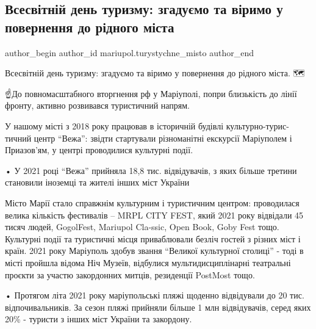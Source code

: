  
 
 
 
 

\subsection{Всесвітній день туризму: згадуємо та віримо у повернення до рідного міста}
\label{sec:27_09_2023.fb.mariupol.turystychne_misto.1.vsesvitnii_den_turyzmu_povernennja}

\ifcmt
 author_begin
   author_id mariupol.turystychne_misto
 author_end
\fi

Всесвітній день туризму: згадуємо та віримо у повернення до рідного міста. 🗺️

☝️До повномасштабного вторгнення рф у Маріуполі, попри близькість до лінії
фронту, активно розвивався туристичний напрям. 

У нашому місті з 2018 року працював в історичній будівлі культурно-турис\hyp{}тичний
центр \enquote{Вежа}: звідти стартували різноманітні екскурсії Маріуполем і Приазов'ям,
у центрі проводилися культурні події. 

• У 2021 році \enquote{Вежа} прийняла 18,8 тис. відвідувачів, з яких більше третини
становили іноземці та жителі інших міст України 

Місто Марії стало справжнім культурним і туристичним центром: проводилася
велика кількість фестивалів – MRPL CITY FEST, який 2021 року відвідали 45 тисяч
людей, GogolFest, Mariupol Cla\hyp{}ssic, Open Book, Goby Fest тощо. Культурні події
та туристичні місця приваблювали безліч гостей з різних міст і країн. 2021 року
Маріуполь здобув звання \enquote{Великої культурної столиці} - тоді в місті пройшла
відома Ніч Музеїв, відбулися мультидисциплінарні театральні проєкти за участю
закордонних митців, резиденції PostMost тощо.

• Протягом літа 2021 року маріупольські пляжі щоденно відвідували до 20 тис.
відпочивальників. За сезон пляжі прийняли більше 1 млн відвідувачів, серед яких
20\% - туристи з інших міст України та закордону.  

